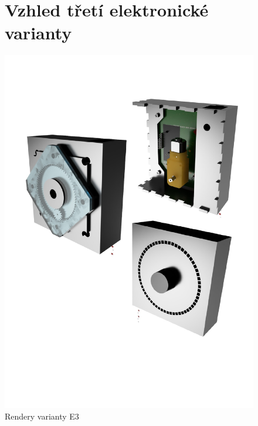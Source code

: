 \begin{figure}
    \section{Vzhled třetí elektronické varianty}
	\centering
	\includegraphics[width=\textwidth]{kapitoly/obrazky/E3/rendery.pdf}
	\caption{Rendery varianty E3}
	\label{fig:E3-renderi}
\end{figure}

